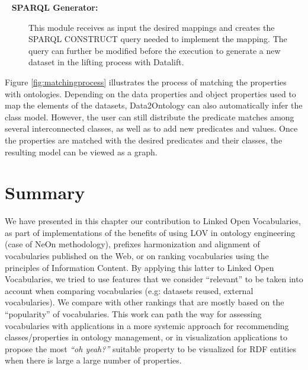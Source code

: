 \begin{description}
\begin{description}
 \item[\odot~ \textbf{SPARQL Generator:}] This module receives as input the desired mappings and creates the SPARQL CONSTRUCT query needed to implement the mapping. The query can further be modified before the execution to generate a new dataset in the lifting process with Datalift.

\end{description}
Figure \ref{fig:matchingprocess} illustrates the process of matching the properties with ontologies. Depending on the data properties and object properties used to map the elements of the datasets, Data2Ontology can also automatically infer the class model. However, the user can still distribute the predicate matches among several interconnected classes, as well as to add new predicates and values. Once the properties are matched with the desired predicates and their classes, the resulting model can be viewed as a graph.

 \begin{figure}

 \end{figure}


\section{Summary}
\label{ch6:conclusion}
We have presented in this chapter our contribution to Linked Open Vocabularies, as part of implementations of the benefits of using LOV in ontology engineering (case of NeOn methodology), prefixes harmonization and alignment of vocabularies published on the Web, or on ranking vocabularies using the principles of Information Content. By applying this latter to Linked Open Vocabularies, we tried to use features that we consider ``relevant'' to be taken into account when comparing vocabularies (e.g: datasets reused, external vocabularies). We compare with other rankings that are mostly based on the ``popularity'' of vocabularies. This work can path the way for assessing vocabularies with applications in a more systemic approach for recommending classes/properties in ontology management, or in visualization applications to propose the most \textit{``oh yeah?''} suitable property to be visualized for RDF entities when there is large a large number of properties.


\end{description}
